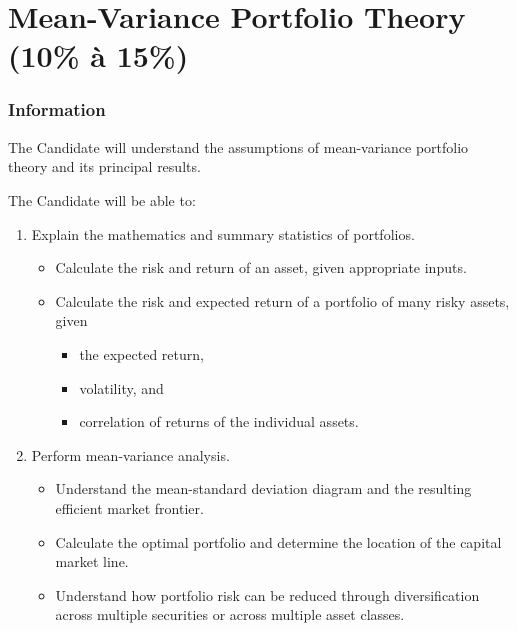 \chapter[Mean-Variance Portfolio Theory]{Mean-Variance Portfolio Theory (10\% à 15\%)}

\subsection{Information}

\begin{distributions}[Objective]
The Candidate will understand the assumptions of mean-variance portfolio theory and its principal results.
\end{distributions}

\begin{outcomes}
The Candidate will be able to:
		\begin{enumerate}[label = \alph*)]
		\item	Explain the mathematics and summary statistics of portfolios.
			\begin{knowledge}[]
			\begin{itemize}
			\item	Calculate the risk and return of an asset, given appropriate inputs.
			\item	Calculate the risk and expected return of a portfolio of many risky assets, given 
				\begin{itemize}
				\item	the expected return, 
				\item	volatility, and 
				\item	correlation of returns of the individual assets.
				\end{itemize}
			\end{itemize}
			\end{knowledge}
		\item	Perform mean-variance analysis.
			\begin{knowledge}[]
			\begin{itemize}
			\item	Understand the mean-standard deviation diagram and the resulting efficient market frontier.
			\item	Calculate the optimal portfolio and determine the location of the capital market line.
			\item	Understand how portfolio risk can be reduced through diversification across multiple securities or across multiple asset classes.
			\end{itemize}
			\end{knowledge}
		\end{enumerate}
\end{outcomes}

